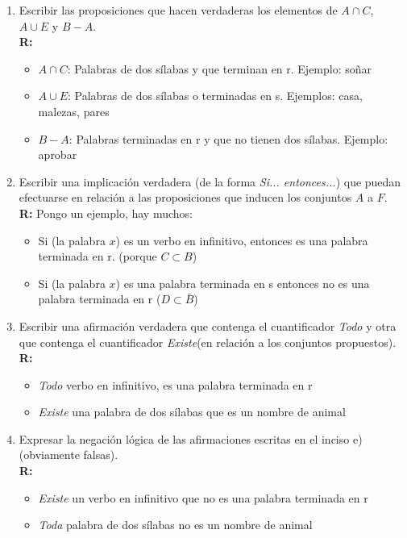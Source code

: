 \documentclass[12pt]{article}
\theoremstyle{definition}
\theoremstyle{remark}
\begin{document}
\begin{enumerate}
	\item Escribir las proposiciones que hacen verdaderas los elementos de  $A \cap C$, $A \cup E$  y  $B -  A$.\\
	\textbf{R:} 
		\begin{itemize}
		\item $A \cap C$: Palabras de dos sílabas y que terminan en r. Ejemplo: soñar
		\item $A \cup E$: Palabras de dos sílabas o terminadas en s. Ejemplos: casa, malezas, pares
		\item $B -  A$: Palabras terminadas en r y que no tienen dos sílabas. Ejemplo: aprobar
		\end{itemize}
	\item Escribir una implicación verdadera (de la forma \textit{Si... entonces...}) que puedan efectuarse en relación a las proposiciones que inducen los conjuntos $A$ a $F$. \\
	\textbf{R:} Pongo un ejemplo, hay muchos:
		\begin{itemize}
		\item Si (la palabra $x$) es un verbo en infinitivo, entonces es una palabra terminada en r. (porque $C \subset B$)
		\item Si (la palabra $x$) es una palabra terminada en s entonces no es una palabra terminada en r ($D \subset  \bar{B}$)
		\end{itemize}
	\item Escribir una afirmación verdadera que contenga el cuantificador \textit{Todo} y otra que contenga el cuantificador \textit{Existe}(en relación a los conjuntos propuestos).
	\textbf{R:} 
		\begin{itemize}
		\item \textit{Todo} verbo en infinitivo, es una palabra terminada en r
		\item \textit{Existe} una palabra de dos sílabas que es un nombre de animal
		\end{itemize}
	\item Expresar la negación lógica de las afirmaciones escritas en el inciso e)  (obviamente falsas).\\
	\textbf{R:} 
		\begin{itemize}
		\item \textit{Existe} un verbo en infinitivo que no es una palabra terminada en r
		\item \textit{Toda} palabra de dos sílabas no es un nombre de animal
		\end{itemize}

\end{enumerate}
\end{document}
